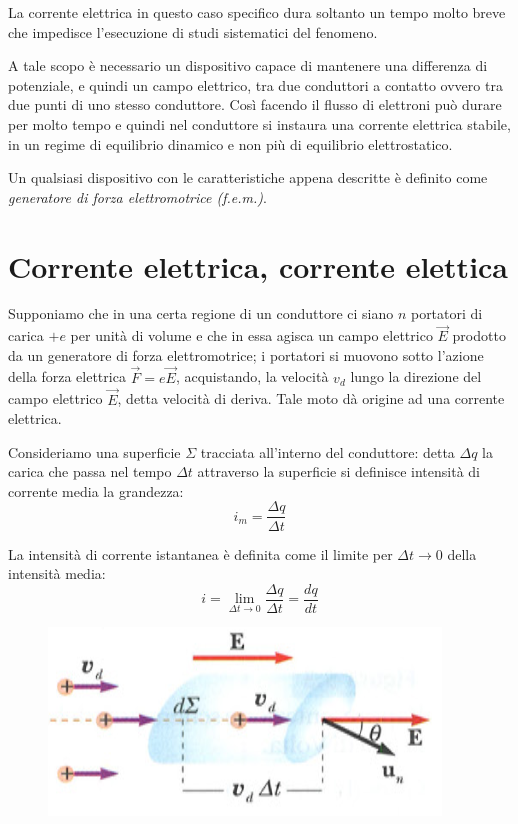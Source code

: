 \documentclass[class=book, crop=false, oneside, 12pt]{standalone}
\begin{document}
La corrente elettrica in questo caso specifico dura soltanto un tempo molto breve che impedisce l'esecuzione di studi sistematici del fenomeno. 

A tale scopo è necessario un dispositivo capace di mantenere una differenza di potenziale, e quindi un campo elettrico, tra due conduttori a contatto ovvero tra due punti di uno stesso conduttore. 
Così facendo il flusso di elettroni può durare per molto tempo e quindi nel conduttore si instaura una corrente elettrica stabile, in un regime di equilibrio dinamico e non più di equilibrio elettrostatico.

Un qualsiasi dispositivo con le caratteristiche appena descritte è definito come \emph{generatore di forza elettromotrice (f.e.m.)}.

\section{Corrente elettrica, corrente elettica}

Supponiamo che in una certa regione di un conduttore ci siano \(n\) portatori di carica \(+e\) per unità di volume e che in essa agisca un campo elettrico \(\overrightarrow{E}\) prodotto da un generatore di forza elettromotrice; i portatori si muovono sotto l'azione della forza elettrica \(\overrightarrow{F} = e \overrightarrow{E}\), acquistando, la velocità \(v_d\) lungo la direzione del campo elettrico \(\overrightarrow{E}\), detta velocità di deriva. 
Tale moto dà origine ad una corrente elettrica.

Consideriamo una superficie \(\Sigma\) tracciata all'interno del conduttore: detta \(\Delta q\) la carica che passa nel tempo \(\Delta t\) attraverso la superficie si definisce intensità di corrente media la grandezza:
\begin{equation*}
    i_m = \frac{\Delta q}{\Delta t}
\end{equation*}

La intensità di corrente istantanea è definita come il limite per \(\Delta t \rightarrow 0\) della intensità media:
\begin{equation*}
    i = \lim_{\Delta t \rightarrow 0 } \frac{\Delta q}{\Delta t} = \frac{dq}{dt}
\end{equation*} 

\begin{figure}[h]
    \includegraphics[scale=0.6]{intensita_corrente_superficie.png}
    \centering
    \caption{}
\end{figure}
\end{document}
